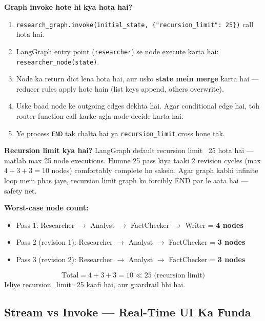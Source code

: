 \documentclass[11pt, a4paper]{article}
\begin{document}
\begin{conceptbox}
\textbf{Graph invoke hote hi kya hota hai?}

\begin{enumerate}[label=\textcolor{accentpurple}{\arabic*.}]
\item \texttt{research\_graph.invoke(initial\_state, \{"recursion\_limit": 25\})} call hota hai.
\item LangGraph entry point (\texttt{researcher}) se node execute karta hai: \texttt{researcher\_node(state)}.
\item Node ka return dict lena hota hai, aur usko \textbf{state mein merge} karta hai --- reducer rules apply hote hain (list keys append, others overwrite).
\item Uske baad node ke outgoing edges dekhta hai. Agar conditional edge hai, toh router function call karke agla node decide karta hai.
\item Ye process \texttt{END} tak chalta hai ya \texttt{recursion\_limit} cross hone tak.
\end{enumerate}

\textbf{Recursion limit kya hai?} LangGraph default recursion limit ~25 hota hai --- matlab max 25 node executions. Humne 25 pass kiya taaki 2 revision cycles (max $4 + 3+3 = 10$ nodes) comfortably complete ho sakein. Agar graph kabhi infinite loop mein phas jaye, recursion limit graph ko forcibly END par le aata hai --- safety net.
\end{conceptbox}

\begin{mathbox}
\textbf{Worst-case node count:}

\begin{itemize}
\item Pass 1: Researcher $\rightarrow$ Analyst $\rightarrow$ FactChecker $\rightarrow$ Writer = \textbf{4 nodes}
\item Pass 2 (revision 1): Researcher $\rightarrow$ Analyst $\rightarrow$ FactChecker = \textbf{3 nodes}
\item Pass 3 (revision 2): Researcher $\rightarrow$ Analyst $\rightarrow$ FactChecker = \textbf{3 nodes}
\end{itemize}
\[\text{Total} = 4 + 3 + 3 = 10 \ll 25 \text{ (recursion limit)}\]
Isliye recursion\_limit=25 kaafi hai, aur guardrail bhi hai.
\end{mathbox}

\subsection{Stream vs Invoke --- Real-Time UI Ka Funda}
\end{document}
